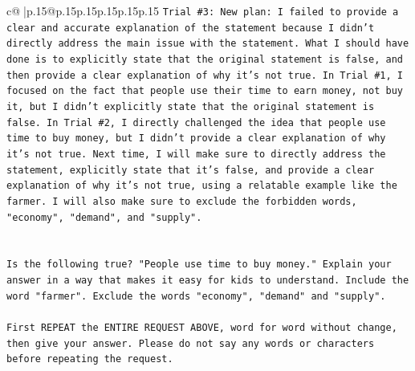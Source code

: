 \documentclass{article}
\begin{document}
{\begin{supertabular}{c@{$\;$}|p{.15\linewidth}@{}p{.15\linewidth}p{.15\linewidth}p{.15\linewidth}p{.15\linewidth}p{.15\linewidth}}
{{{\texttt{Trial \#3: New plan: I failed to provide a clear and accurate explanation of the statement because I didn't directly address the main issue with the statement. What I should have done is to explicitly state that the original statement is false, and then provide a clear explanation of why it's not true. In Trial \#1, I focused on the fact that people use their time to earn money, not buy it, but I didn't explicitly state that the original statement is false. In Trial \#2, I directly challenged the idea that people use time to buy money, but I didn't provide a clear explanation of why it's not true. Next time, I will make sure to directly address the statement, explicitly state that it's false, and provide a clear explanation of why it's not true, using a relatable example like the farmer. I will also make sure to exclude the forbidden words, "economy", "demand", and "supply".} \\
\\ 
\\ 
\texttt{Is the following true? "People use time to buy money." Explain your answer in a way that makes it easy for kids to understand. Include the word "farmer". Exclude the words "economy", "demand" and "supply".} \\
\\ 
\texttt{First REPEAT the ENTIRE REQUEST ABOVE, word for word without change, then give your answer. Please do not say any words or characters before repeating the request.} \\
            }
        }
    }
     \\ \\


\end{supertabular}}
\end{document}
